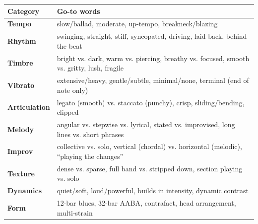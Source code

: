 \documentclass[11pt,letterpaper]{article}
\begin{document}
\begin{small}
\begin{tabularx}{\textwidth}{>{\bfseries\color{headerblue}}p{2.5cm} X}
\toprule
\textbf{Category} & \textbf{Go-to words} \\
\midrule
Tempo & slow/ballad, moderate, up-tempo, breakneck/blazing \\
Rhythm & swinging, straight, stiff, syncopated, driving, laid-back, behind the beat \\
Timbre & bright vs. dark, warm vs. piercing, breathy vs. focused, smooth vs. gritty, lush, fragile \\
Vibrato & extensive/heavy, gentle/subtle, minimal/none, terminal (end of note only) \\
Articulation & legato (smooth) vs. staccato (punchy), crisp, sliding/bending, clipped \\
Melody & angular vs. stepwise vs. lyrical, stated vs. improvised, long lines vs. short phrases \\
Improv & collective vs. solo, vertical (chordal) vs. horizontal (melodic), ``playing the changes'' \\
Texture & dense vs. sparse, full band vs. stripped down, section playing vs. solo \\
Dynamics & quiet/soft, loud/powerful, builds in intensity, dynamic contrast \\
Form & 12-bar blues, 32-bar AABA, contrafact, head arrangement, multi-strain \\
\bottomrule
\end{tabularx}
\end{small}
\end{document}
